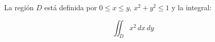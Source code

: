 La región \( D \) está definida por \( 0 \leq x \leq y \), \( x^2 + y^2 \leq 1 \) y la integral:

\[
\iint_D x^2 \, dx \, dy
\]
